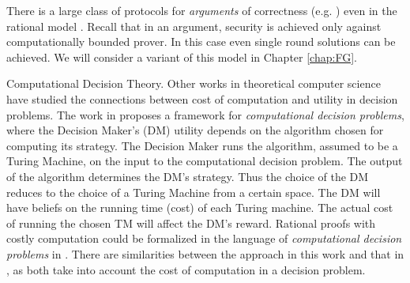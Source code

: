 \medskip
{}
There is a large class of protocols for {\em arguments} of correctness (e.g. \cite{ggp10,ggpr13,krr14}) even in the rational model \cite{ratargs,ratsumchecks}. Recall that in an argument, security is achieved only against computationally bounded prover. In this case even single round solutions can be achieved. We will consider a variant of this model in Chapter \ref{chap:FG}.

\medskip
\noindent
{\sc Computational Decision Theory.}
Other works in theoretical computer science have studied the connections between cost of computation and utility in decision problems.
The work in \cite{halpern2011don} proposes a framework for \emph{computational decision problems}, where the Decision Maker's (DM) utility depends on the algorithm chosen for computing its strategy.
The Decision Maker runs the algorithm, assumed to be a Turing Machine, on the input to the computational decision problem.
The output of the algorithm determines the DM's strategy. 
Thus the choice of the DM reduces to the choice of a Turing Machine from a certain space. The DM will have beliefs on the running time (cost) of each Turing machine. The actual cost of running the chosen TM will affect the DM's reward.
Rational proofs with costly computation could be formalized in the language of \emph{computational decision problems} in \cite{halpern2011don}. There are similarities between the approach in this
work and that in \cite{halpern2011don}, as both take into account the cost of computation in a decision problem.



